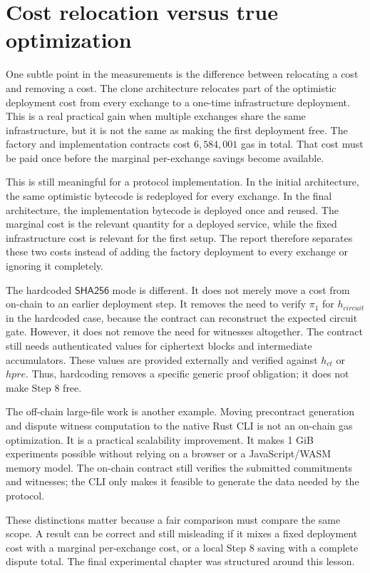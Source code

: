 \section{Cost relocation versus true optimization}

One subtle point in the measurements is the difference between relocating a cost and
removing a cost. The clone architecture relocates part of the optimistic deployment cost
from every exchange to a one-time infrastructure deployment. This is a real practical gain
when multiple exchanges share the same infrastructure, but it is not the same as making the
first deployment free. The factory and implementation contracts cost \(6,584,001\) gas in
total. That cost must be paid once before the marginal per-exchange savings become
available.

This is still meaningful for a protocol implementation. In the initial architecture, the
same optimistic bytecode is redeployed for every exchange. In the final architecture, the
implementation bytecode is deployed once and reused. The marginal cost is the relevant
quantity for a deployed service, while the fixed infrastructure cost is relevant for the
first setup. The report therefore separates these two costs instead of adding the factory
deployment to every exchange or ignoring it completely.

The hardcoded \(\mathsf{SHA256}\) mode is different. It does not merely move a cost from
on-chain to an earlier deployment step. It removes the need to verify \(\pi_1\) for
\(h_{\mathit{circuit}}\) in the hardcoded case, because the contract can reconstruct the
expected circuit gate. However, it does not remove the need for witnesses altogether. The
contract still needs authenticated values for ciphertext blocks and intermediate
accumulators. These values are provided externally and verified against \(h_{\mathit{ct}}\)
or \(hpre\). Thus, hardcoding removes a specific generic proof obligation; it does not make
Step 8 free.

The off-chain large-file work is another example. Moving precontract generation and dispute
witness computation to the native Rust CLI is not an on-chain gas optimization. It is a
practical scalability improvement. It makes 1 GiB experiments possible without relying on a
browser or a JavaScript/WASM memory model. The on-chain contract still verifies the
submitted commitments and witnesses; the CLI only makes it feasible to generate the data
needed by the protocol.

These distinctions matter because a fair comparison must compare the same scope. A result
can be correct and still misleading if it mixes a fixed deployment cost with a marginal
per-exchange cost, or a local Step 8 saving with a complete dispute total. The final
experimental chapter was structured around this lesson.

